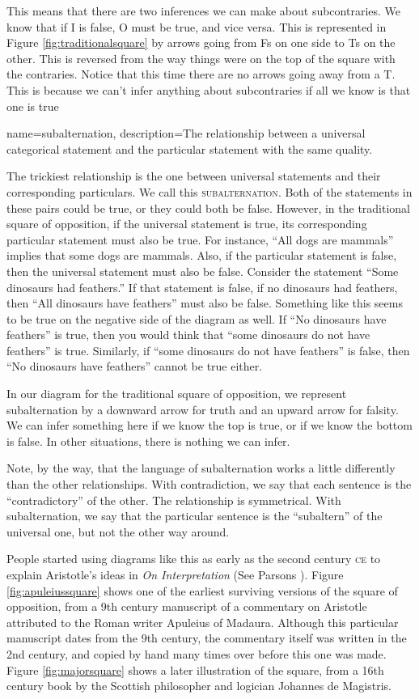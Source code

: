 This means that there are two inferences we can make about subcontraries. We know that if I is false, O must be true, and vice versa. This is represented in Figure \ref{fig:traditionalsquare} by arrows going from Fs on one side to Ts on the other. This is reversed from the way things were on the top of the square with the contraries. Notice that this time there are no arrows going away from a T. This is because we can't infer anything about subcontraries if all we know is that one is true

{
name=subalternation,
description={The relationship between a universal categorical statement and the particular statement with the same quality.}
}


The trickiest relationship is the one between universal statements and their corresponding particulars. We call this \textsc{\gls{subalternation}}. Both of the statements in these pairs could be true, or they could both be false. However, in the traditional square of opposition, if the universal statement is true, its corresponding particular statement must also be true. For instance, ``All dogs are mammals'' implies that some dogs are mammals. Also, if the particular statement is false, then the universal statement must also be false. Consider the statement ``Some dinosaurs had feathers.'' If that statement is false, if no dinosaurs had feathers, then ``All dinosaurs have feathers'' must also be false. Something like this seems to be true on the negative side of the diagram as well. If ``No dinosaurs have feathers'' is true, then you would think that ``some dinosaurs do not have feathers'' is true. Similarly, if ``some dinosaurs do not have feathers'' is false, then ``No dinosaurs have feathers'' cannot be true either.

In our diagram for the traditional square of opposition, we represent subalternation by a downward arrow for truth and an upward arrow for falsity. We can infer something here if we know the top is true, or if we know the bottom is false. In other situations, there is nothing we can infer.

Note, by the way, that the language of subalternation works a little differently than the other relationships. With contradiction, we say that each sentence is the ``contradictory'' of the other. The relationship is symmetrical. With subalternation, we say that the particular sentence is the ``subaltern'' of the universal one, but not the other way around.

People started using diagrams like this as early as the second century \textsc{ce} to explain Aristotle's ideas in \textit{On Interpretation} (See Parsons \cite*{Parsons1997}). Figure \ref{fig:apuleiussquare} shows one of the earliest surviving versions of the square of opposition, from a 9th century manuscript of a commentary on Aristotle attributed to the Roman writer Apuleius of Madaura. Although this particular manuscript dates from the 9th century, the commentary itself was written in the 2nd century, and copied by hand many times over before this one was made. Figure \ref{fig:majorsquare} shows a later illustration of the square, from a 16th century book by the Scottish philosopher and logician Johannes de Magistris.

